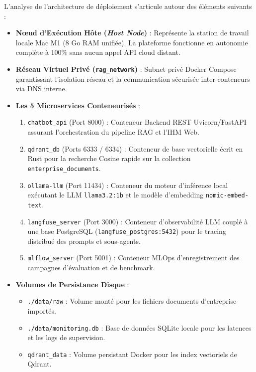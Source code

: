 L'analyse de l'architecture de déploiement s'articule autour des éléments suivants :
\begin{itemize}
    \item \textbf{Nœud d'Exécution Hôte (\textit{Host Node})} : Représente la station de travail locale Mac M1 (8 Go RAM unifiée). La plateforme fonctionne en autonomie complète à $100\%$ sans aucun appel API cloud distant.
    \item \textbf{Réseau Virtuel Privé (\texttt{rag\_network})} : Subnet privé Docker Compose garantissant l'isolation réseau et la communication sécurisée inter-conteneurs via DNS interne.
    \item \textbf{Les 5 Microservices Conteneurisés} :
    \begin{enumerate}
        \item \texttt{chatbot\_api} (Port 8000) : Conteneur Backend REST Uvicorn/FastAPI assurant l'orchestration du pipeline RAG et l'IHM Web.
        \item \texttt{qdrant\_db} (Ports 6333 / 6334) : Conteneur de base vectorielle écrit en Rust pour la recherche Cosine rapide sur la collection \texttt{enterprise\_documents}.
        \item \texttt{ollama-llm} (Port 11434) : Conteneur du moteur d'inférence local exécutant le LLM \texttt{llama3.2:1b} et le modèle d'embedding \texttt{nomic-embed-text}.
        \item \texttt{langfuse\_server} (Port 3000) : Conteneur d'observabilité LLM couplé à une base PostgreSQL (\texttt{langfuse\_postgres:5432}) pour le tracing distribué des prompts et sous-agents.
        \item \texttt{mlflow\_server} (Port 5001) : Conteneur MLOps d'enregistrement des campagnes d'évaluation et de benchmark.
    \end{enumerate}
    \item \textbf{Volumes de Persistance Disque} :
    \begin{itemize}
        \item \texttt{./data/raw} : Volume monté pour les fichiers documents d'entreprise importés.
        \item \texttt{./data/monitoring.db} : Base de données SQLite locale pour les latences et les logs de supervision.
        \item \texttt{qdrant\_data} : Volume persistant Docker pour les index vectoriels de Qdrant.
    \end{itemize}
\end{itemize}

